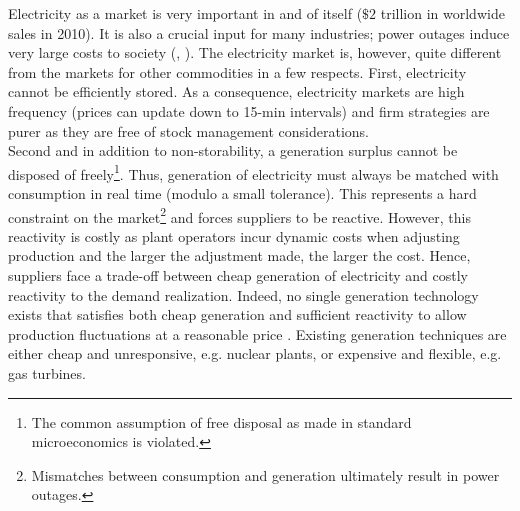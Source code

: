 Electricity as a market is very important in and of itself ($\$2$ trillion in worldwide sales in 2010). It is also a crucial input for many industries; power outages induce very large costs to society (\cite{lacommare2004understanding}, \cite{reichl2013power}). 
The electricity market is, however, quite different from the markets for other commodities in a few respects. First, electricity cannot be efficiently stored. As a consequence, electricity markets are high frequency (prices can update down to 15-min intervals) and firm strategies are purer as they are free of stock management considerations. \\

Second and in addition to non-storability, a generation surplus cannot be disposed of freely\footnote{The common assumption of free disposal as made in standard microeconomics is violated.}. Thus, generation of electricity must always be matched with consumption in real time (modulo a small tolerance). This represents a hard constraint on the market\footnote{Mismatches between consumption and generation ultimately result in power outages.} and forces suppliers to be reactive. However, this reactivity is costly as plant operators incur dynamic costs when adjusting production and the larger the adjustment made, the larger the cost. 
Hence, suppliers face a trade-off between cheap generation of electricity and costly reactivity to the demand realization. Indeed, no single generation technology exists that satisfies both cheap generation and sufficient reactivity to allow production fluctuations at a reasonable price . Existing generation techniques are either cheap and unresponsive, e.g. nuclear plants, or expensive and flexible, e.g. gas turbines. \\
 
